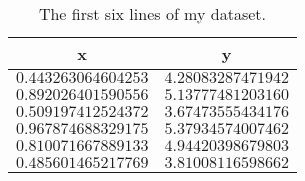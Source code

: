 \begin{table}[!tbp]
\caption{The first six lines of my dataset.\label{tab:data}} 
\begin{center}
\begin{tabular}{rr}
\hline\hline
\multicolumn{1}{c}{x}&\multicolumn{1}{c}{y}\tabularnewline
\hline
$0.443263064604253$&$4.28083287471942$\tabularnewline
$0.892026401590556$&$5.13777481203160$\tabularnewline
$0.509197412524372$&$3.67473555434176$\tabularnewline
$0.967874688329175$&$5.37934574007462$\tabularnewline
$0.810071667889133$&$4.94420398679803$\tabularnewline
$0.485601465217769$&$3.81008116598662$\tabularnewline
\hline
\end{tabular}\end{center}
\end{table}
